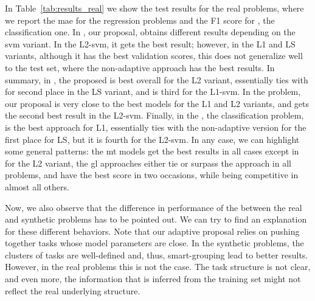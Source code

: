 In Table~\ref{tab:results_real} we show the test results for the real problems, where we report the \acrshort{mae} for the regression problems and the F1 score for , the classification one.
%
In , our proposal,  obtains different results depending on the \acrshort{svm} variant. In the L2-\acrshort{svm}, it gets the best result; however, in the L1 and LS variants, although it has the best validation scores, this does not generalize well to the test set, where the non-adaptive  approach has the best results.
%
In summary, in , the proposed  is best overall for the L2 variant, essentially ties with  for second place in the LS variant, and is third for the L1-\acrshort{svm}.
%
In the  problem, our proposal is very close to the best models for the L1 and L2 variants, and gets the second best result in the L2-\acrshort{svm}.
%
Finally, in the , the classification problem,  is the best approach for L1, essentially ties with the non-adaptive version for the first place for LS, but it is fourth for the L2-\acrshort{svm}.
%
In any case, we can highlight some general patterns: the \acrshort{mt} models get the best results in all cases except in  for the L2 variant, the \acrshort{gl} approaches either tie or surpass the  approach in all problems, and  have the best score in two occasions, while being competitive in almost all others.

Now, we also observe that the difference in performance of the  between the real and synthetic problems has to be pointed out.
We can try to find an explanation for these different behaviors. Note that our adaptive proposal relies on pushing together tasks whose model parameters are close. In the synthetic problems, the clusters of tasks are well-defined and, thus, smart-grouping lead to better results. However, in the real problems this is not the case. The task structure is not clear, and even more, the information that is inferred from the training set might not reflect the real underlying structure.
%


